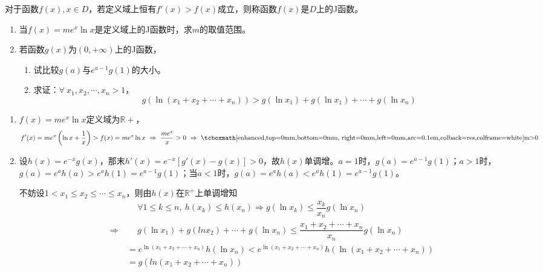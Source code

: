 \begin{que}
	对于函数$f(x),x\in D$，若定义域上恒有$f'(x)>f(x)$成立，则称函数$f(x)$是$D$上的J函数。
	\begin{enumerate}
		\item 当$f(x)=me^x\ln x$是定义域上的J函数时，求$m$的取值范围。
		\item 若函数$g(x)$为$(0,+\infty)$上的J函数，
		\begin{enumerate}
			\item 试比较$g(a)$与$e^{a-1}g(1)$的大小。
			\item 求证：$\forall\ x_1,x_2,\cdots,x_n>1$，$$g(\ln(x_1+x_2+\cdots+x_n))>g(\ln x_1)+g(\ln x_1)+\cdots+g(\ln x_n)$$
		\end{enumerate}
	\end{enumerate}
\end{que}
\sol{} \begin{enumerate}
	\item $f(x)=me^x\ln x$定义域为$\mathbb{R}+$，$$f'(x)=me^x\left(\ln x+\dfrac{1}{x}\right)>f(x)=me^x\ln x\ \Rightarrow\ \dfrac{me^x}{x}>0\ \Rightarrow\ \res{m>0}$$
	\item 设$h(x)=e^{-x}g(x)$，那末$h'(x)=e^{-x}\left[g'(x)-g(x)\right]>0$，故$h(x)$单调增。$a=1$时，$g(a)=e^{a-1}g(1)$；$a>1$时，$g(a)=e^ah(a)>e^ah(1)=e^{a-1}g(1)$；当$a<1$时，$g(a)=e^ah(a)<e^ah(1)=e^{a-1}g(1)$。\par
	不妨设$1<x_1\leqslant x_2\leqslant\cdots \leqslant x_n$，则由$h(x)$在$\mathbb{R}^+$上单调增知$$\begin{aligned}
		&\quad\  \forall 1\leqslant k\leqslant n,\ h(x_k)\leqslant h(x_n)\Rightarrow g(\ln x_k)\leqslant \dfrac{x_k}{x_n}g(\ln x_n)\\
		\Rightarrow\ &\quad\ g(\ln x_1)+g(ln x_2)+\cdots+g(\ln x_n)\leqslant \dfrac{x_1+x_2+\cdots+x_n}{x_n}g(\ln x_n)\\
		&=e^{\ln(x_1+x_2+\cdots+x_n)}h(\ln x_n)<e^{\ln(x_1+x_2+\cdots+x_n)}h(\ln(x_1+x_2+\cdots+x_n))\\
		&=g(ln(x_1+x_2+\cdots+x_n))
	\end{aligned}$$
\end{enumerate}\par\hfill{}\normal

